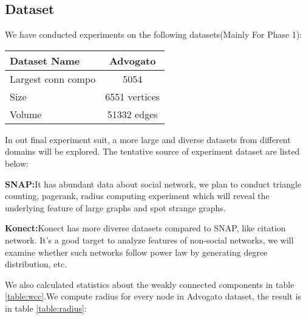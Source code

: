 \subsection{Dataset}
We have conducted experiments on the following datasets(Mainly For Phase 1):
\begin{center}
\begin{tabular}{| l | c |}
  \hline                        
  Dataset Name & Advogato  \\ \hline
  Largest conn compo & 5054  \\ \hline
  Size & 6551 vertices  \\ \hline
  Volume & 51332 edges \\ \hline
\end{tabular}
\end{center}

In out final experiment suit, a more large and diverse datasets from different domains will be explored. The tentative source of experiment dataset are listed below:
\begin{description}
	\item{{\bf SNAP:}}{It has abundant data about social network, we plan to conduct triangle counting, pagerank, radius computing experiment which will reveal the underlying feature of large graphs and spot strange graphs.}
	\item{{\bf Konect:}}{Konect has more diverse datasets compared to SNAP, like citation network. It's a good target to analyze features of non-social networks, we will examine whether such networks follow power law by generating degree distribution, etc.}
\end{description}

We also calculated statistics about the weakly connected components in table \ref{table:wcc}.We compute radius for every node in Advogato dataset, the result is in table \ref{table:radius}:




















